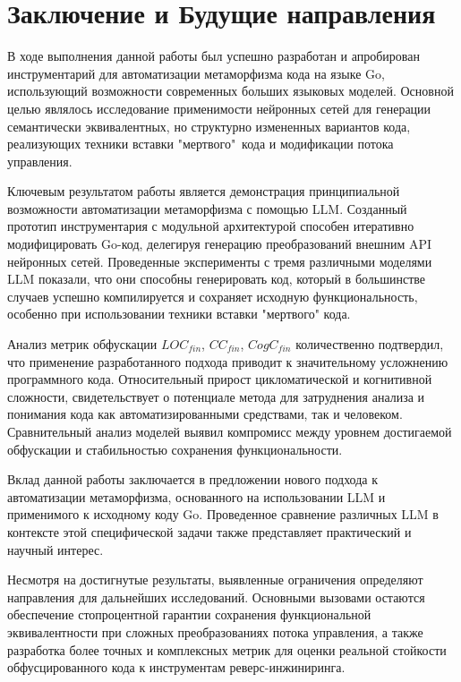 \section{Заключение и Будущие направления}

В ходе выполнения данной работы был успешно разработан и апробирован инструментарий для автоматизации метаморфизма кода на языке Go, использующий возможности современных больших языковых моделей. Основной целью являлось исследование применимости нейронных сетей для генерации семантически эквивалентных, но структурно измененных вариантов кода, реализующих техники вставки "мертвого"\, кода и модификации потока управления.

Ключевым результатом работы является демонстрация принципиальной возможности автоматизации метаморфизма с помощью LLM. Созданный прототип инструментария с модульной архитектурой способен итеративно модифицировать Go-код, делегируя генерацию преобразований внешним API нейронных сетей. Проведенные эксперименты с тремя различными моделями LLM показали, что они способны генерировать код, который в большинстве случаев успешно компилируется и сохраняет исходную функциональность, особенно при использовании техники вставки "мертвого" кода.

Анализ метрик обфускации $LOC_{fin}$, $CC_{fin}$, $CogC_{fin}$ количественно подтвердил, что применение разработанного подхода приводит к значительному усложнению программного кода. Относительный прирост цикломатической и когнитивной сложности, свидетельствует о потенциале метода для затруднения анализа и понимания кода как автоматизированными средствами, так и человеком. Сравнительный анализ моделей выявил компромисс между уровнем достигаемой обфускации и стабильностью сохранения функциональности.

Вклад данной работы заключается в предложении нового подхода к автоматизации метаморфизма, основанного на использовании LLM и применимого к исходному коду Go. Проведенное сравнение различных LLM в контексте этой специфической задачи также представляет практический и научный интерес.

Несмотря на достигнутые результаты, выявленные ограничения определяют направления для дальнейших исследований. Основными вызовами остаются обеспечение стопроцентной гарантии сохранения функциональной эквивалентности при сложных преобразованиях потока управления, а также разработка более точных и комплексных метрик для оценки реальной стойкости обфусцированного кода к инструментам реверс-инжиниринга.

